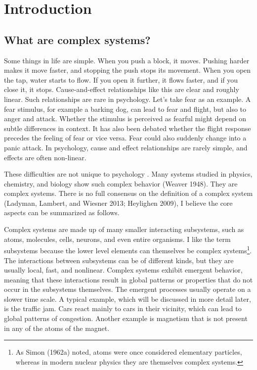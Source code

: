 \documentclass[
  a4paper,
  DIV=11,
  numbers=noendperiod,
  oneside]{scrreprt}
\begin{document}

\hypertarget{sec-ch1}{%
\chapter{Introduction}\label{sec-ch1}}

\hypertarget{sec-What-are-complex-systems-secWhat}{%
\section{What are complex
systems?}\label{sec-What-are-complex-systems-secWhat}}

Some things in life are simple. When you push a block, it moves. Pushing
harder makes it move faster, and stopping the push stops its movement.
When you open the tap, water starts to flow. If you open it further, it
flows faster, and if you close it, it stops. Cause-and-effect
relationships like this are clear and roughly linear. Such relationships
are rare in psychology. Let's take fear as an example. A fear stimulus,
for example a barking dog, can lead to fear and flight, but also to
anger and attack. Whether the stimulus is perceived as fearful might
depend on subtle differences in context. It has also been debated
whether the flight response precedes the feeling of fear or vice versa.
Fear could also suddenly change into a panic attack. In psychology,
cause and effect relationships are rarely simple, and effects are often
non-linear.

These difficulties are not unique to psychology . Many systems studied
in physics, chemistry, and biology show such complex behavior (Weaver
1948). They are complex systems. There is no full consensus on the
definition of a complex system (Ladyman, Lambert, and Wiesner 2013;
Heylighen 2009), I believe the core aspects can be summarized as
follows.

Complex systems are made up of many smaller interacting subsystems, such
as atoms, molecules, cells, neurons, and even entire organisms. I like
the term subsystems because the lower level elements can themselves be
complex systems\footnote{As Simon (1962a) noted, atoms were once
  considered elementary particles, whereas in modern nuclear physics
  they are themselves complex systems.}. The interactions between
subsystems can be of different kinds, but they are usually local, fast,
and nonlinear. Complex systems exhibit emergent behavior, meaning that
these interactions result in global patterns or properties that do not
occur in the subsystems themselves. The emergent processes usually
operate on a slower time scale. A typical example, which will be
discussed in more detail later, is the traffic jam. Cars react mainly to
cars in their vicinity, which can lead to global patterns of congestion.
Another example is magnetism that is not present in any of the atoms of
the magnet.
\end{document}
